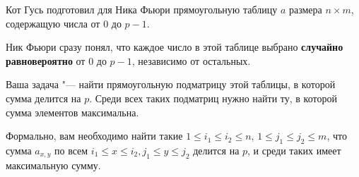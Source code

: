 Кот Гусь подготовил для Ника Фьюри прямоугольную таблицу $a$ размера $n \times m$, содержащую числа от $0$ до $p-1$. 

Ник Фьюри сразу понял, что каждое число в этой таблице выбрано \textbf{случайно равновероятно} от $0$ до $p-1$, независимо от остальных.

Ваша задача "--- найти прямоугольную подматрицу этой таблицы, в которой сумма делится на $p$. Среди всех таких подматриц нужно найти ту, в которой сумма элементов максимальна.

Формально, вам необходимо найти такие $1 \leq i_1 \leq i_2 \leq n$, $1 \leq j_1 \leq j_2 \leq m$, что сумма $a_{x, y}$ по всем $i_1 \leq x \leq i_2, j_1 \leq y \leq j_2$ делится на $p$, и среди таких имеет максимальную сумму.